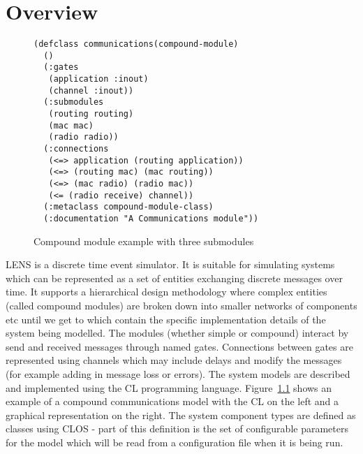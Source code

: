 \documentclass[a4paper,11pt,twoside,openany]{report}
\newcommand{\acr}[1]{\acrshort{#1}}
\begin{document}
\chapter{Overview}

\begin{figure}
\begin{minipage}[b]{0.7\textwidth}
\begin{lstlisting}
(defclass communications(compound-module)
  ()
  (:gates
   (application :inout)
   (channel :inout))
  (:submodules
   (routing routing)
   (mac mac)
   (radio radio))
  (:connections
   (<=> application (routing application))
   (<=> (routing mac) (mac routing))
   (<=> (mac radio) (radio mac))
   (<= (radio receive) channel))
  (:metaclass compound-module-class)
  (:documentation "A Communications module"))
\end{lstlisting}
\end{minipage} \hspace{1cm}

\caption{Compound module example with three submodules}
\label{fig:compound}
\end{figure}

\acrfull{LENS} is a discrete time event simulator. It is suitable for
simulating systems which can be represented as a set of entities
exchanging discrete messages over time. It supports a
hierarchical design methodology where complex entities (called
compound modules) are broken down into smaller
networks of components etc until we get to  which contain the specific implementation details of the
system being modelled. The modules (whether simple or compound)
interact by send and received messages through named
gates. Connections between gates are represented using
channels which may include delays and modify the
messages (for example adding in message loss or errors).  The system
models are described and implemented using the \acrfull{CL}
programming language. Figure~\ref{fig:compound} shows an example of a
compound communications model with the \acr{CL} on the left and a
graphical representation on the right.  The system component types are
defined as classes using \acrfull{CLOS} - part of this definition is
the set of configurable parameters for the model which will be read
from a configuration file when it is being run.
\end{document}

